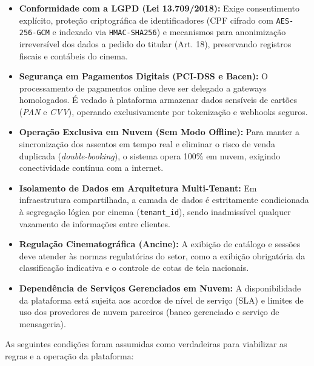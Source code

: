 \begin{itemize}
\tightlist
\item \textbf{Conformidade com a LGPD (Lei 13.709/2018):} Exige consentimento explícito, proteção criptográfica de identificadores (CPF cifrado com \texttt{AES-256-GCM} e indexado via \texttt{HMAC-SHA256}) e mecanismos para anonimização irreversível dos dados a pedido do titular (Art. 18), preservando registros fiscais e contábeis do cinema.
\item \textbf{Segurança em Pagamentos Digitais (PCI-DSS e Bacen):} O processamento de pagamentos online deve ser delegado a gateways homologados. É vedado à plataforma armazenar dados sensíveis de cartões (\emph{PAN} e \emph{CVV}), operando exclusivamente por tokenização e webhooks seguros.
\item \textbf{Operação Exclusiva em Nuvem (Sem Modo Offline):} Para manter a sincronização dos assentos em tempo real e eliminar o risco de venda duplicada (\emph{double-booking}), o sistema opera 100\% em nuvem, exigindo conectividade contínua com a internet.
\item \textbf{Isolamento de Dados em Arquitetura Multi-Tenant:} Em infraestrutura compartilhada, a camada de dados é estritamente condicionada à segregação lógica por cinema (\texttt{tenant\_id}), sendo inadmissível qualquer vazamento de informações entre clientes.
\item \textbf{Regulação Cinematográfica (Ancine):} A exibição de catálogo e sessões deve atender às normas regulatórias do setor, como a exibição obrigatória da classificação indicativa e o controle de cotas de tela nacionais.
\item \textbf{Dependência de Serviços Gerenciados em Nuvem:} A disponibilidade da plataforma está sujeita aos acordos de nível de serviço (SLA) e limites de uso dos provedores de nuvem parceiros (banco gerenciado e serviço de mensageria).
\end{itemize}


As seguintes condições foram assumidas como verdadeiras para viabilizar as regras e a operação da plataforma:

